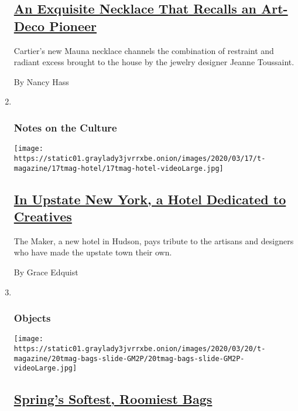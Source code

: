 \begin{enumerate}
  \hypertarget{an-exquisite-necklace-that-recalls-an-art-deco-pioneer}{%
  \subsection{\texorpdfstring{\href{/2020/03/16/t-magazine/cartier-mauna-necklace.html}{An
  Exquisite Necklace That Recalls an Art-Deco
  Pioneer}}{An Exquisite Necklace That Recalls an Art-Deco Pioneer}}\label{an-exquisite-necklace-that-recalls-an-art-deco-pioneer}}

  Cartier's new Mauna necklace channels the combination of restraint and
  radiant excess brought to the house by the jewelry designer Jeanne
  Toussaint.

  By Nancy Hass
\item ~
  \hypertarget{notes-on-the-culture-2}{%
  \subsubsection{Notes on the Culture}\label{notes-on-the-culture-2}}

  \texttt{[image: https://static01.graylady3jvrrxbe.onion/images/2020/03/17/t-magazine/17tmag-hotel/17tmag-hotel-videoLarge.jpg]}

  \hypertarget{in-upstate-new-york-a-hotel-dedicated-to-creatives}{%
  \subsection{\texorpdfstring{\href{/2020/03/17/t-magazine/maker-hotel-hudson.html}{In
  Upstate New York, a Hotel Dedicated to
  Creatives}}{In Upstate New York, a Hotel Dedicated to Creatives}}\label{in-upstate-new-york-a-hotel-dedicated-to-creatives}}

  The Maker, a new hotel in Hudson, pays tribute to the artisans and
  designers who have made the upstate town their own.

  By Grace Edquist
\item ~
  \hypertarget{objects-1}{%
  \subsubsection{Objects}\label{objects-1}}

  \texttt{[image: https://static01.graylady3jvrrxbe.onion/images/2020/03/20/t-magazine/20tmag-bags-slide-GM2P/20tmag-bags-slide-GM2P-videoLarge.jpg]}

  \hypertarget{springs-softest-roomiest-bags}{%
  \subsection{\texorpdfstring{\href{/2020/03/20/t-magazine/spring-bags.html}{Spring's
  Softest, Roomiest
  Bags}}{Spring's Softest, Roomiest Bags}}\label{springs-softest-roomiest-bags}}


\end{enumerate}

